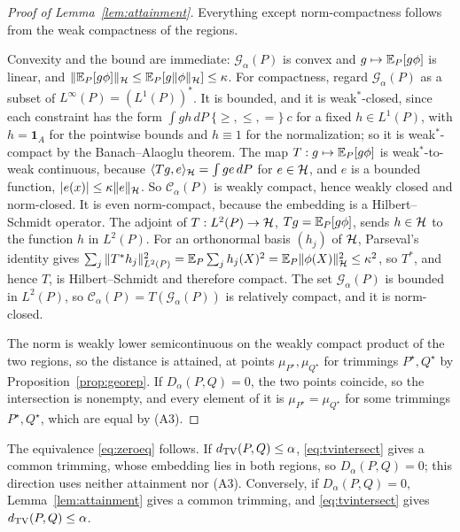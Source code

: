 \begin{proof}[Proof of Lemma~\ref{lem:attainment}]
Everything except norm-compactness follows from the weak compactness of the regions.

Convexity and the bound are immediate: $\mathcal G_\alpha(P)$ is convex and $g\mapsto\mathbb{E}_P[g\phi]$ is linear, and
$\|\mathbb{E}_P[g\phi]\|_{\mathcal{H}}\le\mathbb{E}_P[g\|\phi\|_{\mathcal{H}}]\le\kappa$. For compactness, regard $\mathcal G_\alpha(P)$ as a subset of
$L^\infty(P)=(L^1(P))^*$. It is bounded, and it is weak$^*$-closed, since each constraint has the form
$\int gh\,dP\ \{\ge,\le,=\}\ c$ for a fixed $h\in L^1(P)$, with $h=\mathbf 1_A$ for the pointwise bounds and $h\equiv1$
for the normalization; so it is weak$^*$-compact by the Banach--Alaoglu theorem. The map $T:g\mapsto\mathbb{E}_P[g\phi]$ is
weak$^*$-to-weak continuous, because $\langle Tg,e\rangle_{\mathcal{H}}=\int ge\,dP$ for $e\in\mathcal{H}$, and $e$ is a bounded
function, $|e(x)|\le\kappa\|e\|_{\mathcal{H}}$. So $\mathcal C_\alpha(P)$ is weakly compact, hence weakly
closed and norm-closed. It is even norm-compact, because the embedding is a Hilbert--Schmidt operator. The adjoint of
$T:L^2(P)\to\mathcal{H}$, $Tg=\mathbb{E}_P[g\phi]$, sends $h\in\mathcal{H}$ to the function $h$ in $L^2(P)$. For an orthonormal basis $(h_j)$
of $\mathcal{H}$, Parseval's identity gives $\sum_j\|T^*h_j\|^2_{L^2(P)}=\mathbb{E}_P\sum_jh_j(X)^2=\mathbb{E}_P\|\phi(X)\|_{\mathcal{H}}^2\le\kappa^2$,
so $T^*$, and hence $T$, is Hilbert--Schmidt and therefore compact. The set $\mathcal G_\alpha(P)$ is bounded in
$L^2(P)$, so $\mathcal C_\alpha(P)=T(\mathcal G_\alpha(P))$ is relatively compact, and it is norm-closed.

The norm is weakly lower semicontinuous on the weakly compact product of the two regions, so the distance is attained,
at points $\mu_{P^\star},\mu_{Q^\star}$ for trimmings $P^\star,Q^\star$ by Proposition~\ref{prop:georep}. If
$D_\alpha(P,Q)=0$, the two points coincide, so the intersection is nonempty, and every element of it is
$\mu_{P^\star}=\mu_{Q^\star}$ for some trimmings $P^\star,Q^\star$, which are equal by (A3).
\end{proof}

The equivalence \eqref{eq:zeroeq} follows. If $d_{\mathrm{TV}}(P,Q)\le\alpha$, \eqref{eq:tvintersect} gives a common trimming,
whose embedding lies in both regions, so $D_\alpha(P,Q)=0$; this direction uses neither attainment nor (A3).
Conversely, if $D_\alpha(P,Q)=0$, Lemma~\ref{lem:attainment} gives a common trimming, and \eqref{eq:tvintersect} gives
$d_{\mathrm{TV}}(P,Q)\le\alpha$.

